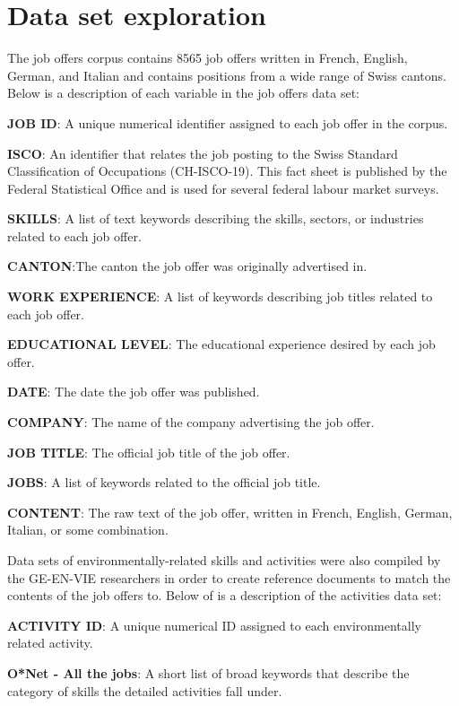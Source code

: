 \label{sec:dataset}
\section{Data set exploration}

The job offers corpus contains 8565 job offers written in French, English, German, and Italian and contains positions from a wide range of Swiss cantons. Below is a description of each variable in the job offers data set:

\textbf{JOB ID}: A unique numerical identifier assigned to each job offer in the corpus.

\textbf{ISCO}: An identifier that relates the job posting to the Swiss Standard 	
Classification of Occupations (CH-ISCO-19). This fact sheet is published by the Federal
Statistical Office and is used for several federal labour market surveys. 

\textbf{SKILLS}: A list of text keywords describing the skills, sectors, or industries related to each job offer.

\textbf{CANTON}:The canton the job offer was originally advertised in. 

\textbf{WORK EXPERIENCE}: A list of keywords describing job titles related to each job offer.

\textbf{EDUCATIONAL LEVEL}: The educational experience desired by each job offer.

\textbf{DATE}: The date the job offer was published. 

\textbf{COMPANY}: The name of the company advertising the job offer. 

\textbf{JOB TITLE}: The official job title of the job offer. 

\textbf{JOBS}: A list of keywords related to the official job title.

\textbf{CONTENT}: The raw text of the job offer, written in French, English, German, Italian, or some combination. 

Data sets of environmentally-related skills and activities were also compiled by the GE-EN-VIE researchers in order to create reference documents to match the contents of the job offers to. Below of is a description of the activities data set:

\textbf{ACTIVITY ID}: A unique numerical ID assigned to each environmentally related activity.

\textbf{O*Net - All the jobs}: A short list of broad keywords that describe the category of skills the detailed activities fall under. 

